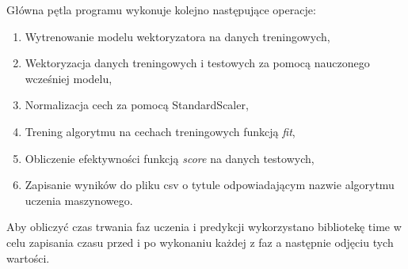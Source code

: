 Główna pętla programu wykonuje kolejno następujące operacje:
\begin{enumerate}
    \item Wytrenowanie modelu wektoryzatora na danych treningowych,
    \item Wektoryzacja danych treningowych i testowych za pomocą 
    nauczonego wcześniej modelu,
    \item Normalizacja cech za pomocą StandardScaler,
    \item Trening algorytmu na cechach treningowych funkcją \textit{fit},
    \item Obliczenie efektywności funkcją \textit{score} na danych testowych,
    \item Zapisanie wyników do pliku csv o tytule odpowiadającym nazwie algorytmu 
    uczenia maszynowego.
\end{enumerate}
Aby obliczyć czas trwania faz uczenia i predykcji wykorzystano bibliotekę time w celu
zapisania czasu przed i po wykonaniu każdej z faz a następnie odjęciu tych wartości.